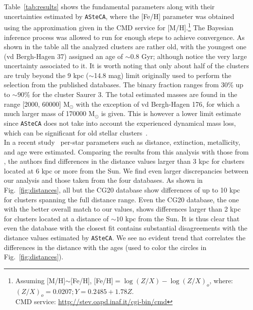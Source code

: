 \documentclass[referee]{aa}
\begin{document}
  Table~\ref{tab:results} shows the fundamental parameters along with their
  uncertainties estimated by \texttt{ASteCA}, where the [Fe/H] parameter was
  obtained using the approximation given in the CMD service for
  [M/H].\footnote{Assuming [M/H]$\sim$[Fe/H], [Fe/H]$=\log(Z/X)-\log(Z/X)_{o}$, where:
  $(Z/X)_{o}=0.0207; Y=0.2485+1.78Z$.\\
  CMD service: \url{http://stev.oapd.inaf.it/cgi-bin/cmd}}
  The Bayesian inference process was allowed to run for enough steps to achieve
  convergence.
  As shown in the table all the analyzed clusters are rather old, with the
  youngest one (vd Bergh-Hagen 37) assigned an age of $\sim0.8$ Gyr; although
  notice the very large uncertainty associated to it. It is worth noting
  that only about half of the clusters are truly beyond the 9 kpc ($\sim$14.8
  mag) limit originally used to perform the selection from the published
  databases. The binary fraction ranges from 30\% up to $\sim90$\% for the
  cluster Saurer 3. The total estimated masses are found in the range [2000,
  60000] M$_{\odot}$ with the exception of vd Bergh-Hagen 176, for which a much
  larger mass of 170000 M$_{\odot}$ is given. This is however a lower limit
  estimate since \texttt{ASteCA} does not take into account the
  experienced dynamical mass loss, which can be significant for old stellar
  clusters~\citep{Martinez_2017}.\\

  In a recent study~\citep{Anders_2021} per-star parameters such as distance,
  extinction, metallicity, and age were estimated. Comparing the results
  from this analysis with those from \cite{Cantat_2020}, the authors find
  differences in the distance values larger than 3 kpc for clusters located at
  6 kpc or more from the Sun. We find even larger discrepancies between our
  analysis and those taken from the four databases. As shown in
  Fig.~\ref{fig:distances}, all but the CG20 database show differences of up
  to 10 kpc for clusters spanning the full distance range. Even the CG20
  database, the one with the better overall match to our values, shows
  differences larger than 2 kpc for clusters located at a distance of $\sim10$
  kpc from the Sun. It is thus clear that even the database with the closest fit
  contains substantial disagreements with the distance values estimated by 
  \texttt{ASteCA}. We see no evident trend that correlates the differences in
  the distance with the ages (used to color the circles in
  Fig.~\ref{fig:distances}).\\
\end{document}
